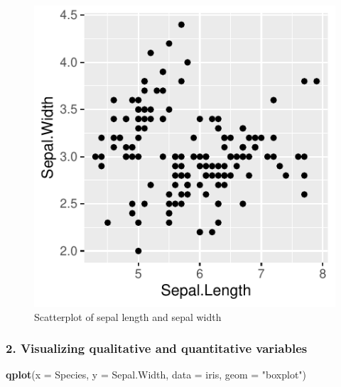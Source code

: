 \documentclass[]{article}
\newenvironment{Shaded}{\begin{snugshade}}{\end{snugshade}}
\newcommand{\DataTypeTok}[1]{\textcolor[rgb]{0.13,0.29,0.53}{#1}}
\newcommand{\KeywordTok}[1]{\textcolor[rgb]{0.13,0.29,0.53}{\textbf{#1}}}
\newcommand{\NormalTok}[1]{#1}
\newcommand{\StringTok}[1]{\textcolor[rgb]{0.31,0.60,0.02}{#1}}
\begin{document}
\begin{figure}
\centering
\includegraphics{Week3Answers_files/figure-latex/unnamed-chunk-8-1.pdf}
\caption{Scatterplot of sepal length and sepal width}
\end{figure}

\newpage

\hypertarget{visualizing-qualitative-and-quantitative-variables}{%
\subsubsection{2. Visualizing qualitative and quantitative
variables}\label{visualizing-qualitative-and-quantitative-variables}}

\begin{Shaded}
\begin{Highlighting}[]
\KeywordTok{qplot}\NormalTok{(}\DataTypeTok{x =}\NormalTok{ Species, }\DataTypeTok{y =}\NormalTok{ Sepal.Width, }\DataTypeTok{data =}\NormalTok{ iris, }\DataTypeTok{geom =} \StringTok{"boxplot"}\NormalTok{)}
\end{Highlighting}
\end{Shaded}
\end{document}
